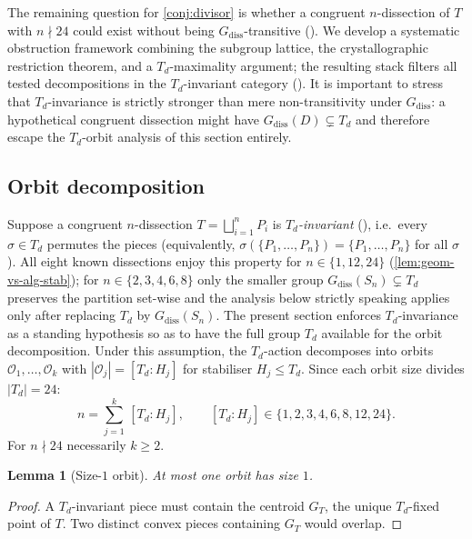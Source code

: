 \documentclass[11pt,a4paper]{article}
\theoremstyle{plain}
\newtheorem{lemma}[lemma]{Lemma}
\theoremstyle{definition}
\theoremstyle{remark}
\newcommand{\Td}{T_{\!d}}
\newcommand{\calO}{\mathcal{O}}
\begin{document}
\medskip

The remaining question for \cref{conj:divisor} is whether a congruent
$n$-dissection of $T$ with $n \nmid 24$ could exist without being
$G_{\mathrm{diss}}$-transitive ().  We develop a
systematic obstruction framework combining the subgroup lattice, the
crystallographic restriction theorem, and a $\Td$-maximality argument; the
resulting stack filters all tested decompositions in the $\Td$-invariant
category ().  It is important to stress that
$\Td$-invariance is strictly stronger than mere non-transitivity under
$G_{\mathrm{diss}}$: a hypothetical congruent dissection might have
$G_{\mathrm{diss}}(D) \subsetneq \Td$ and therefore escape the $\Td$-orbit
analysis of this section entirely.

\subsection{Orbit decomposition}\label{ssec:orbit-decomp}

Suppose a congruent $n$-dissection $T = \bigsqcup_{i=1}^{n} P_{i}$ is
\emph{$\Td$-invariant} (), i.e.\ every
$\sigma \in \Td$ permutes the pieces
(equivalently, $\sigma(\{P_1,\ldots,P_n\}) = \{P_1,\ldots,P_n\}$ for all
$\sigma$).  All eight known dissections enjoy this property for
$n \in \{1,12,24\}$ (\cref{lem:geom-vs-alg-stab}); for
$n \in \{2,3,4,6,8\}$ only the smaller group
$G_{\mathrm{diss}}(S_{n}) \subsetneq \Td$ preserves the partition set-wise
and the analysis below strictly speaking applies only after replacing $\Td$
by $G_{\mathrm{diss}}(S_{n})$.  The present section enforces $\Td$-invariance
as a standing hypothesis so as to have the full group $\Td$ available for
the orbit decomposition.
Under this assumption, the $\Td$-action decomposes into orbits
$\calO_{1}, \ldots, \calO_{k}$ with
$|\calO_{j}| = [\Td : H_{j}]$ for stabiliser $H_{j} \leq \Td$.  Since each
orbit size divides $|\Td| = 24$:
\begin{equation}\label{eq:orbit-decomp}
  n = \sum_{j=1}^{k}\, [\Td : H_{j}],
  \qquad
  [\Td : H_{j}] \in \{1,2,3,4,6,8,12,24\}.
\end{equation}
For $n \nmid 24$ necessarily $k \geq 2$.

\begin{lemma}[Size-$1$ orbit]\label{lem:size-1}
At most one orbit has size $1$.
\end{lemma}

\begin{proof}
A $\Td$-invariant piece must contain the centroid $G_{T}$, the unique
$\Td$-fixed point of $T$.  Two distinct convex pieces containing $G_{T}$
would overlap.
\end{proof}
\end{document}
